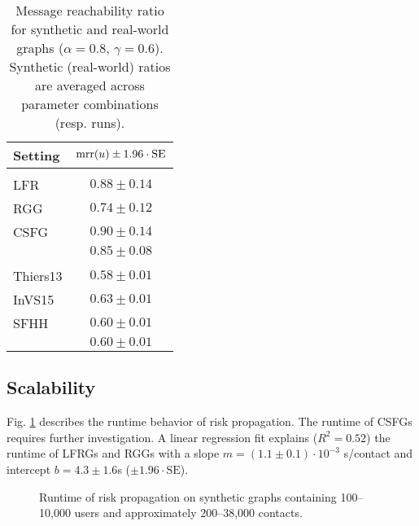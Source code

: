 \begin{table}[htbp]
	\centering
	\begin{tabular}{lc}
		\toprule
		\bfseries Setting & $\operatorname{mrr}(u) \pm 1.96 \cdot \text{SE}$\\
		\midrule
		\rowgroup{\itshape Synthetic} \\
		LFR & $0.88 \pm 0.14$\\
		RGG & $0.74 \pm 0.12$\\
		CSFG & $0.90 \pm 0.14$\\
		& $\boldsymbol{0.85 \pm 0.08}$ \\
		\midrule
		\rowgroup{\itshape Real-world} \\
		Thiers13 & $0.58 \pm 0.01$\\
		InVS15 & $0.63 \pm 0.01$\\
		SFHH & $0.60 \pm 0.01$\\
		& $\boldsymbol{0.60 \pm 0.01}$ \\
		\bottomrule
	\end{tabular}
	\caption{Message reachability ratio for synthetic and real-world graphs ($\alpha = 0.8$, $\gamma = 0.6$). Synthetic (real-world) ratios are averaged across parameter combinations (resp. runs).}
	\label{tab:reachability}
\end{table}

\subsection{Scalability}
\par Fig. \ref{fig:runtime} describes the runtime behavior of risk propagation. The runtime of CSFGs requires further investigation. A linear regression fit explains ($R^2 = 0.52$) the runtime of LFRGs and RGGs with a slope $m = (1.1 \pm 0.1) \cdot 10^{-3}$ s/contact and intercept $b = 4.3 \pm 1.6$s ($\pm 1.96 \cdot \text{SE}$).

\begin{figure}[htbp]
	\centering
	\caption{Runtime of risk propagation on synthetic graphs containing 100--10,000 users and approximately 200--38,000 contacts.}
	\label{fig:runtime}
\end{figure}